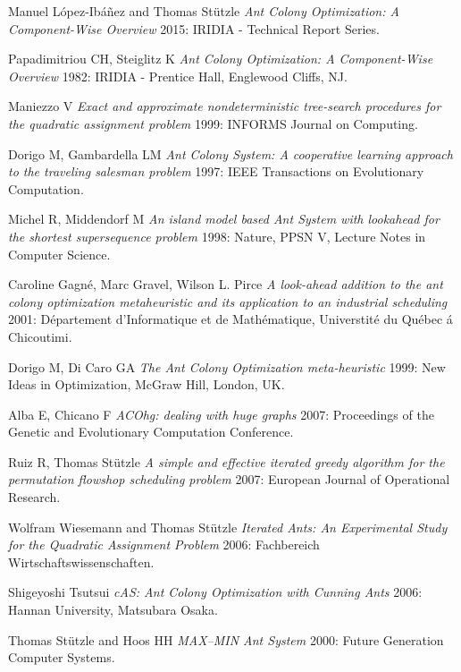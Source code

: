 \documentclass[12pt]{article}
\begin{document}
\begin{thebibliography}{1}

 Manuel L{\'o}pez-Ib{\'a}{\~n}ez and Thomas St{\"u}tzle {\em Ant Colony Optimization: A Component-Wise Overview} 2015: IRIDIA - Technical Report Series.

 Papadimitriou CH, Steiglitz K {\em Ant Colony Optimization: A Component-Wise Overview} 1982: IRIDIA - Prentice Hall, Englewood Cliffs, NJ.

 Maniezzo V {\em Exact and approximate nondeterministic tree-search procedures for the quadratic assignment problem} 1999: INFORMS Journal on Computing.

 Dorigo M, Gambardella LM {\em Ant Colony System: A cooperative learning
approach to the traveling salesman problem} 1997: IEEE Transactions on Evolutionary
Computation.

 Michel R, Middendorf M {\em An island model based Ant System with
lookahead for the shortest supersequence problem} 1998: Nature, PPSN V, Lecture Notes in Computer Science.

 Caroline Gagn{\'e}, Marc Gravel, Wilson L. Pirce {\em  A look-ahead addition to the ant colony optimization metaheuristic and its application to an industrial scheduling} 2001: D{\'e}partement d'Informatique et de Math{\'e}matique, Universtit{\'e} du Qu{\'e}bec {\'a} Chicoutimi.

 Dorigo M, Di Caro GA {\em The Ant Colony Optimization meta-heuristic} 1999: New Ideas in Optimization, McGraw Hill, London, UK.

 Alba E, Chicano F {\em ACOhg: dealing with huge graphs} 2007: Proceedings of the Genetic and Evolutionary Computation Conference.

 Ruiz R, Thomas St{\"u}tzle {\em A simple and effective iterated greedy algorithm for the permutation flowshop scheduling problem} 2007: European Journal of Operational Research.

 Wolfram Wiesemann and Thomas St{\"u}tzle {\em Iterated Ants: An Experimental Study for the Quadratic Assignment Problem} 2006: Fachbereich Wirtschaftswissenschaften.

 Shigeyoshi Tsutsui {\em cAS: Ant Colony Optimization with Cunning
Ants} 2006: Hannan University, Matsubara Osaka.

 Thomas St{\"u}tzle and Hoos HH {\em MAX–MIN Ant System} 2000: Future Generation Computer Systems.


\end{thebibliography}
\end{document}
